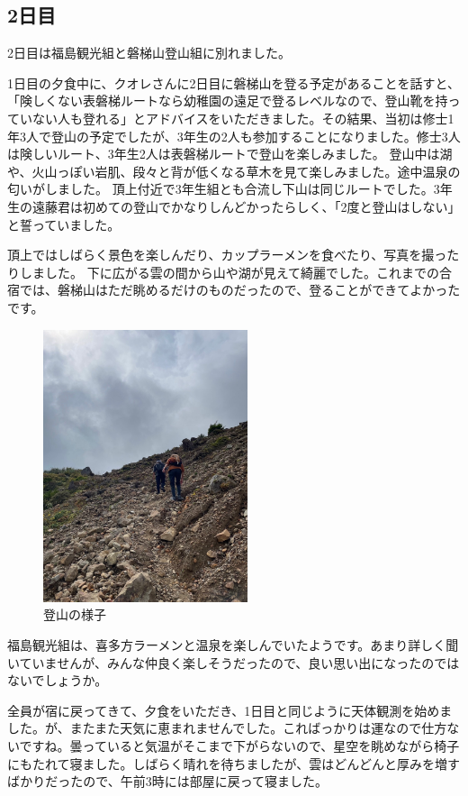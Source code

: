 \documentclass[../main]{subfiles}
\begin{document}
\subsection{2日目}
2日目は福島観光組と磐梯山登山組に別れました。

1日目の夕食中に、クオレさんに2日目に磐梯山を登る予定があることを話すと、「険しくない表磐梯ルートなら幼稚園の遠足で登るレベルなので、登山靴を持っていない人も登れる」とアドバイスをいただきました。その結果、当初は修士1年3人で登山の予定でしたが、3年生の2人も参加することになりました。修士3人は険しいルート、3年生2人は表磐梯ルートで登山を楽しみました。
登山中は湖や、火山っぽい岩肌、段々と背が低くなる草木を見て楽しみました。途中温泉の匂いがしました。
頂上付近で3年生組とも合流し下山は同じルートでした。3年生の遠藤君は初めての登山でかなりしんどかったらしく、「2度と登山はしない」と誓っていました。

頂上ではしばらく景色を楽しんだり、カップラーメンを食べたり、写真を撮ったりしました。
下に広がる雲の間から山や湖が見えて綺麗でした。これまでの合宿では、磐梯山はただ眺めるだけのものだったので、登ることができてよかったです。
\begin{figure}[H]
\centering
\includegraphics[width=6cm]{sections/Nakahara/IMG_8389.jpg}
\caption{登山の様子}
\centering
\end{figure}

福島観光組は、喜多方ラーメンと温泉を楽しんでいたようです。あまり詳しく聞いていませんが、みんな仲良く楽しそうだったので、良い思い出になったのではないでしょうか。

全員が宿に戻ってきて、夕食をいただき、1日目と同じように天体観測を始めました。が、またまた天気に恵まれませんでした。こればっかりは運なので仕方ないですね。曇っていると気温がそこまで下がらないので、星空を眺めながら椅子にもたれて寝ました。しばらく晴れを待ちましたが、雲はどんどんと厚みを増すばかりだったので、午前3時には部屋に戻って寝ました。
\end{document}
